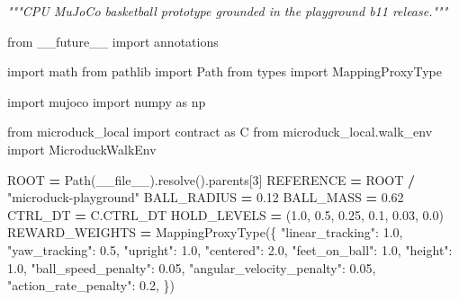 \documentclass[
  chinese,
  11pt,
  letterpaper,
]{article}
\newenvironment{Shaded}{\begin{snugshade}}{\end{snugshade}}
\newcommand{\CommentTok}[1]{\textcolor[rgb]{0.56,0.35,0.01}{\textit{#1}}}
\newcommand{\DecValTok}[1]{\textcolor[rgb]{0.00,0.00,0.81}{#1}}
\newcommand{\FloatTok}[1]{\textcolor[rgb]{0.00,0.00,0.81}{#1}}
\newcommand{\ImportTok}[1]{#1}
\newcommand{\NormalTok}[1]{#1}
\newcommand{\OperatorTok}[1]{\textcolor[rgb]{0.81,0.36,0.00}{\textbf{#1}}}
\newcommand{\StringTok}[1]{\textcolor[rgb]{0.31,0.60,0.02}{#1}}
\newcommand{\VariableTok}[1]{\textcolor[rgb]{0.00,0.00,0.00}{#1}}
\renewenvironment{Shaded}{\par\smallskip}{\par\smallskip}
\begin{document}
\begin{Shaded}
\begin{Highlighting}[]
\CommentTok{"""CPU MuJoCo basketball prototype grounded in the playground b11 release."""}

\ImportTok{from}\NormalTok{ \_\_future\_\_ }\ImportTok{import}\NormalTok{ annotations}

\ImportTok{import}\NormalTok{ math}
\ImportTok{from}\NormalTok{ pathlib }\ImportTok{import}\NormalTok{ Path}
\ImportTok{from}\NormalTok{ types }\ImportTok{import}\NormalTok{ MappingProxyType}

\ImportTok{import}\NormalTok{ mujoco}
\ImportTok{import}\NormalTok{ numpy }\ImportTok{as}\NormalTok{ np}

\ImportTok{from}\NormalTok{ microduck\_local }\ImportTok{import}\NormalTok{ contract }\ImportTok{as}\NormalTok{ C}
\ImportTok{from}\NormalTok{ microduck\_local.walk\_env }\ImportTok{import}\NormalTok{ MicroduckWalkEnv}

\NormalTok{ROOT }\OperatorTok{=}\NormalTok{ Path(}\VariableTok{\_\_file\_\_}\NormalTok{).resolve().parents[}\DecValTok{3}\NormalTok{]}
\NormalTok{REFERENCE }\OperatorTok{=}\NormalTok{ ROOT }\OperatorTok{/} \StringTok{"microduck{-}playground"}
\NormalTok{BALL\_RADIUS }\OperatorTok{=} \FloatTok{0.12}
\NormalTok{BALL\_MASS }\OperatorTok{=} \FloatTok{0.62}
\NormalTok{CTRL\_DT }\OperatorTok{=}\NormalTok{ C.CTRL\_DT}
\NormalTok{HOLD\_LEVELS }\OperatorTok{=}\NormalTok{ (}\FloatTok{1.0}\NormalTok{, }\FloatTok{0.5}\NormalTok{, }\FloatTok{0.25}\NormalTok{, }\FloatTok{0.1}\NormalTok{, }\FloatTok{0.03}\NormalTok{, }\FloatTok{0.0}\NormalTok{)}
\NormalTok{REWARD\_WEIGHTS }\OperatorTok{=}\NormalTok{ MappingProxyType(\{}
    \StringTok{"linear\_tracking"}\NormalTok{: }\FloatTok{1.0}\NormalTok{,}
    \StringTok{"yaw\_tracking"}\NormalTok{: }\FloatTok{0.5}\NormalTok{,}
    \StringTok{"upright"}\NormalTok{: }\FloatTok{1.0}\NormalTok{,}
    \StringTok{"centered"}\NormalTok{: }\FloatTok{2.0}\NormalTok{,}
    \StringTok{"feet\_on\_ball"}\NormalTok{: }\FloatTok{1.0}\NormalTok{,}
    \StringTok{"height"}\NormalTok{: }\FloatTok{1.0}\NormalTok{,}
    \StringTok{"ball\_speed\_penalty"}\NormalTok{: }\FloatTok{0.05}\NormalTok{,}
    \StringTok{"angular\_velocity\_penalty"}\NormalTok{: }\FloatTok{0.05}\NormalTok{,}
    \StringTok{"action\_rate\_penalty"}\NormalTok{: }\FloatTok{0.2}\NormalTok{,}
\NormalTok{\})}



\end{Highlighting}
\end{Shaded}
\end{document}
